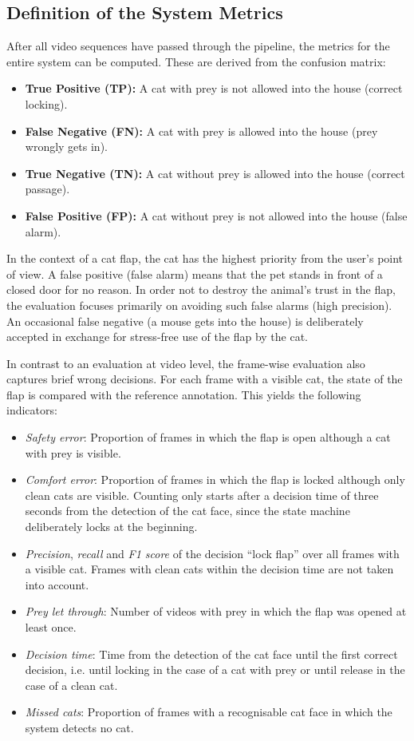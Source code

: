 \subsection{Definition of the System Metrics}
After all video sequences have passed through the pipeline, the metrics for the entire system can be computed. These are derived from the confusion matrix:

\begin{itemize}
    \item \textbf{True Positive (TP):} A cat with prey is not allowed into the house (correct locking).
    \item \textbf{False Negative (FN):} A cat with prey is allowed into the house (prey wrongly gets in).
    \item \textbf{True Negative (TN):} A cat without prey is allowed into the house (correct passage).
    \item \textbf{False Positive (FP):} A cat without prey is not allowed into the house (false alarm).
\end{itemize}

In the context of a cat flap, the cat has the highest priority from the user's point of view. A false positive (false alarm) means that the pet stands in front of a closed door for no reason. In order not to destroy the animal's trust in the flap, the evaluation focuses primarily on avoiding such false alarms (high precision). An occasional false negative (a mouse gets into the house) is deliberately accepted in exchange for stress-free use of the flap by the cat.


In contrast to an evaluation at video level, the frame-wise evaluation also captures brief wrong decisions. For each frame with a visible cat, the state of the flap is compared with the reference annotation. This yields the following indicators:

\begin{itemize}
    \item \emph{Safety error}: Proportion of frames in which the flap is open although a cat with prey is visible.
    \item \emph{Comfort error}: Proportion of frames in which the flap is locked although only clean cats are visible. Counting only starts after a decision time of three seconds from the detection of the cat face, since the state machine deliberately locks at the beginning.
    \item \emph{Precision}, \emph{recall} and \emph{F1 score} of the decision ``lock flap'' over all frames with a visible cat. Frames with clean cats within the decision time are not taken into account.
    \item \emph{Prey let through}: Number of videos with prey in which the flap was opened at least once.
    \item \emph{Decision time}: Time from the detection of the cat face until the first correct decision, i.e. until locking in the case of a cat with prey or until release in the case of a clean cat.
    \item \emph{Missed cats}: Proportion of frames with a recognisable cat face in which the system detects no cat.
\end{itemize}

